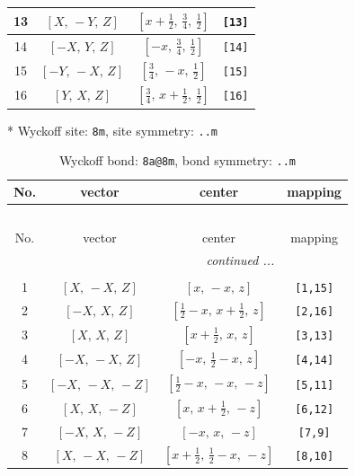 \documentclass[fleqn,8pt]{jsarticle}
\begin{document}
\begin{longtable}{cccc}
13 & $\left[ X,\, - Y,\, Z \right]$ & $\left[ x + \frac{1}{2},\, \frac{3}{4},\, \frac{1}{2} \right]$ & {\tt [13]} \\ \hline
14 & $\left[ - X,\, Y,\, Z \right]$ & $\left[ - x,\, \frac{3}{4},\, \frac{1}{2} \right]$ & {\tt [14]} \\ \hline
15 & $\left[ - Y,\, - X,\, Z \right]$ & $\left[ \frac{3}{4},\, - x,\, \frac{1}{2} \right]$ & {\tt [15]} \\ \hline
16 & $\left[ Y,\, X,\, Z \right]$ & $\left[ \frac{3}{4},\, x + \frac{1}{2},\, \frac{1}{2} \right]$ & {\tt [16]} \\
\end{longtable}
* Wyckoff site: {\tt 8m}, site symmetry: {\tt ..m}
\renewcommand{\arraystretch}{1.2}
\begin{longtable}{cccc}
\caption{Wyckoff bond: {\tt 8a@8m}, bond symmetry: {\tt ..m}}
 \\
 \hline \hline
No. & vector & center & mapping \\ \hline \endfirsthead

\multicolumn{3}{l}{\tablename\ \thetable{}} \\
 \hline \hline
No. & vector & center & mapping \\ \hline \endhead

 \hline \hline
\multicolumn{3}{r}{\footnotesize\it continued ...} \\ \endfoot

 \hline \hline
\multicolumn{3}{r}{} \\ \endlastfoot

1 & $\left[ X,\, - X,\, Z \right]$ & $\left[ x,\, - x,\, z \right]$ & {\tt [1,15]} \\ \hline
2 & $\left[ - X,\, X,\, Z \right]$ & $\left[ \frac{1}{2} - x,\, x + \frac{1}{2},\, z \right]$ & {\tt [2,16]} \\ \hline
3 & $\left[ X,\, X,\, Z \right]$ & $\left[ x + \frac{1}{2},\, x,\, z \right]$ & {\tt [3,13]} \\ \hline
4 & $\left[ - X,\, - X,\, Z \right]$ & $\left[ - x,\, \frac{1}{2} - x,\, z \right]$ & {\tt [4,14]} \\ \hline
5 & $\left[ - X,\, - X,\, - Z \right]$ & $\left[ \frac{1}{2} - x,\, - x,\, - z \right]$ & {\tt [5,11]} \\ \hline
6 & $\left[ X,\, X,\, - Z \right]$ & $\left[ x,\, x + \frac{1}{2},\, - z \right]$ & {\tt [6,12]} \\ \hline
7 & $\left[ - X,\, X,\, - Z \right]$ & $\left[ - x,\, x,\, - z \right]$ & {\tt [7,9]} \\ \hline
8 & $\left[ X,\, - X,\, - Z \right]$ & $\left[ x + \frac{1}{2},\, \frac{1}{2} - x,\, - z \right]$ & {\tt [8,10]} \\
\end{longtable}
\end{document}
